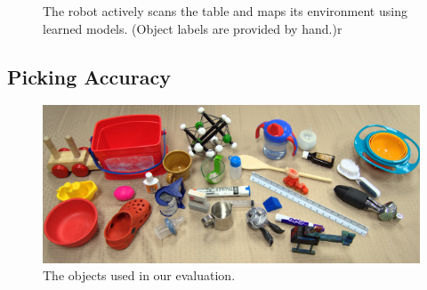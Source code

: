 \documentclass[graybox]{svmult}
\begin{document}
\begin{figure}
\caption{The robot actively scans the table and maps its environment
  using learned models.  (Object labels are provided by hand.)\label{fig:map}r}
\end{figure}



\subsection{Picking Accuracy}

\begin{figure}
\includegraphics[width=1\linewidth]{figures/object_glory_shot.jpg}
\caption{The objects used in our evaluation.\label{fig:object_glory_shot}}
\end{figure}
\end{document}
